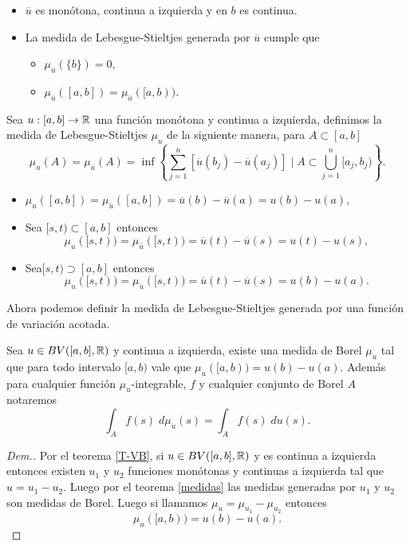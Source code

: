 \begin{obs}
	\begin{itemize}
		\item $\overline{u}$ es monótona, continua a izquierda y en $b$ es continua.
		\item La medida de Lebesgue-Stieltjes generada por $\overline{u}$ cumple que 
		\begin{itemize}
			\item $\mu_{\overline{u}}(\{b\})=0,$
			\item $\mu_{\overline{u}}([a,b])=\mu_{\overline{u}}([a,b)).$
		\end{itemize}
	\end{itemize}
\end{obs}
\begin{defi}
	Sea $u:[a,b]\to\mathbb{R}$ una función  monótona y continua a izquierda,  definimos la medida de Lebesgue-Stieltjes $\mu_u$ de la siguiente manera,  para $A\subset[a,b]$
	$$\mu_{u}(A)=\mu_{\overline{u}}(A)=\inf\left\lbrace \sum_{ j=1 }^n[\overline{u}(b_j)-\overline{u}(a_j)] \mid A\subset \bigcup_{j=1}^n[a_j,b_j)\right\rbrace. $$
	
	
\end{defi}

\begin{obs}
	\begin{itemize}
        \item $\mu_{u}([a,b])=\mu_{\overline{u}}([a,b])=\overline{u}(b)-\overline{u}(a)=u(b)-u(a),$
		\item Sea $[s,t)\subset[a,b]$ entonces $$\mu_{u}([s,t))=\mu_{\overline{u}}([s,t))=\overline{u}(t)-\overline{u}(s)=u(t)-u(s),$$
		
		\item Sea$[s,t)\supset[a,b]$ entonces
		$$\mu_{u}([s,t))=\mu_{\overline{u}}([s,t))=\overline{u}(t)-\overline{u}(s)=u(b)-u(a).$$
	\end{itemize}
\end{obs}








Ahora podemos definir la medida de Lebesgue-Stieltjes generada por una función de variación acotada.
\begin{thm} \label{Thm:medidas}
	Sea $u\in BV([a,b],\mathbb{R})$ y continua a izquierda, existe una medida de Borel $\mu_{u}$ tal que para todo intervalo $[a,b)$ vale que $\mu_{u}([a,b))=u(b)-u(a)$. Además para cualquier función $\mu_{u}$-integrable, $f$ y cualquier conjunto de Borel $A$ notaremos
	$$\int_{A}f(s)\;d\mu_{u}(s)=\int_{A}f(s)\;du(s).$$  
\end{thm}
\begin{proof}[Dem.]
Por el teorema \ref{T-VB}, si $u\in BV([a,b],\mathbb{R})$ y es continua a izquierda entonces existen $u_1$ y $u_2$ funciones monótonas y continuas a izquierda tal que $u=u_1-u_2$. Luego por el teorema \ref{medidas} las medidas generadas por $u_1$ y $u_2$ son medidas de Borel. Luego si llamamos  $\mu_u=\mu_{u_1}-\mu_{u_2}$  entonces
$$\mu_{u}([a,b))=u(b)-u(a).$$
\end{proof}



